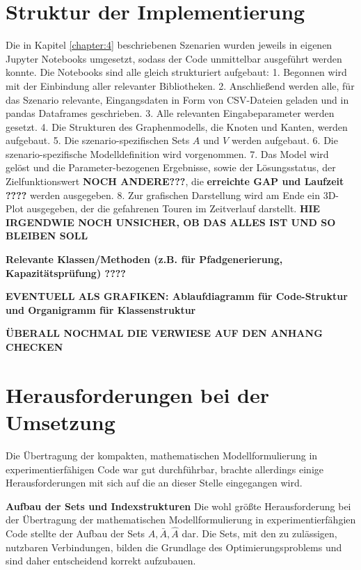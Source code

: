 \section{Struktur der Implementierung}
Die in  Kapitel \ref{chapter:4} beschriebenen Szenarien wurden jeweils in eigenen Jupyter Notebooks umgesetzt, sodass der Code unmittelbar ausgeführt werden konnte. Die Notebooks sind alle gleich strukturiert aufgebaut: 1. Begonnen wird mit der Einbindung aller relevanter Bibliotheken. 2. Anschließend werden alle, für das Szenario relevante, Eingangsdaten in Form von CSV-Dateien geladen und in pandas Dataframes geschrieben. 3. Alle relevanten Eingabeparameter werden gesetzt. 4. Die Strukturen des Graphenmodells, die Knoten und Kanten, werden aufgebaut. 5. Die szenario-spezifischen Sets $A$ und $V$ werden aufgebaut. 6. Die szenario-spezifische Modelldefinition wird vorgenommen. 7. Das Model wird gelöst und die Parameter-bezogenen Ergebnisse, sowie der Lösungsstatus, der Zielfunktionswert \textbf{NOCH ANDERE???}, die \textbf{erreichte GAP und Laufzeit ????} werden ausgegeben. 8. Zur grafischen Darstellung wird am Ende ein 3D-Plot ausgegeben, der die gefahrenen Touren im Zeitverlauf darstellt. \textbf{HIE IRGENDWIE NOCH UNSICHER, OB DAS ALLES IST UND SO BLEIBEN SOLL}

\textbf{Relevante Klassen/Methoden (z.B. für Pfadgenerierung, Kapazitätsprüfung) ????}

\textbf{EVENTUELL ALS GRAFIKEN: Ablaufdiagramm für Code-Struktur und Organigramm für Klassenstruktur}

\textbf{ÜBERALL NOCHMAL DIE VERWIESE AUF DEN ANHANG CHECKEN}

\section{Herausforderungen bei der Umsetzung}
Die Übertragung der kompakten, mathematischen Modellformulierung in experimentierfähigen Code war gut durchführbar, brachte allerdings einige Herausforderungen mit sich auf die an dieser Stelle eingegangen wird.

\textbf{Aufbau der Sets und Indexstrukturen}
Die wohl größte Herausforderung bei der Übertragung der mathematischen Modellformulierung in experimentierfähgien Code stellte der Aufbau der Sets $A, \bar{A}, \hat{A}$ dar. Die Sets, mit den zu zulässigen, nutzbaren Verbindungen, bilden die Grundlage des Optimierungsproblems und sind daher entscheidend korrekt aufzubauen.

